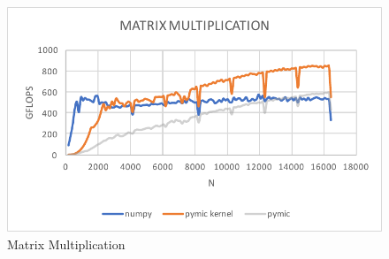 \begin{figure}[]
\centering
\includegraphics[scale=0.7]{img/dot128.pdf}
\caption{Matrix Multiplication}
\label{fig:func-dot}
\end{figure}